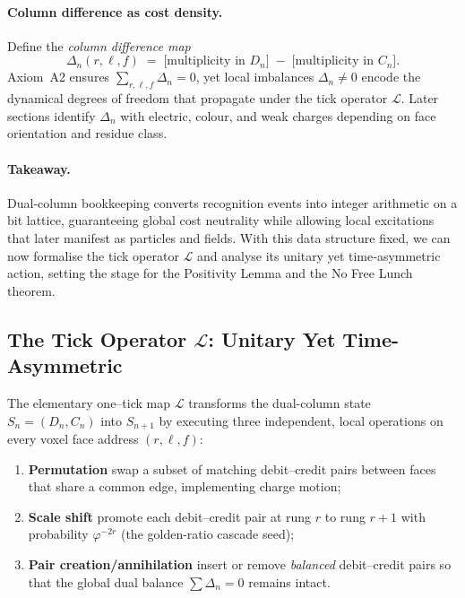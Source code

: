 \documentclass[11pt]{article}
\begin{document}
\paragraph{Column difference as cost density.}
Define the \emph{column difference map}
\[
\Delta_{n}(r,\ell,f) \;=\;
\bigl[\text{multiplicity in }D_{n}\bigr]
\;-\;
\bigl[\text{multiplicity in }C_{n}\bigr].
\]
Axiom~A2 ensures \(\sum_{r,\ell,f}\Delta_{n}=0\), yet local imbalances \(\Delta_{n}\neq0\) encode the dynamical degrees of freedom that propagate under the tick operator \(\mathcal{L}\).  Later sections identify \(\Delta_{n}\) with electric, colour, and weak charges depending on face orientation and residue class.

\paragraph{Takeaway.}
Dual‐column bookkeeping converts recognition events into integer arithmetic on a bit lattice, guaranteeing global cost neutrality while allowing local excitations that later manifest as particles and fields.  With this data structure fixed, we can now formalise the tick operator \(\mathcal{L}\) and analyse its unitary yet time‐asymmetric action, setting the stage for the Positivity Lemma and the No Free Lunch theorem.

\subsection{The Tick Operator \texorpdfstring{$\mathcal{L}$}{L}: Unitary Yet Time-Asymmetric}
\label{subsec:tick-operator}

The elementary one–tick map \(\mathcal{L}\) transforms the dual-column state
\(S_{n}=(D_{n},C_{n})\) into \(S_{n+1}\) by executing three independent,
local operations on every voxel face address \((r,\ell,f)\):

\begin{enumerate}
  \item \textbf{Permutation}  
        swap a subset of matching debit–credit pairs between faces that
        share a common edge, implementing charge motion;
  \item \textbf{Scale shift}  
        promote each debit–credit pair at rung \(r\) to rung
        \(r+1\) with probability \(\varphi^{-2r}\) (the golden-ratio
        cascade seed);
  \item \textbf{Pair creation/annihilation}  
        insert or remove \emph{balanced} debit–credit pairs so that the
        global dual balance \(\sum\Delta_{n}=0\) remains intact.
\end{enumerate}
\end{document}
